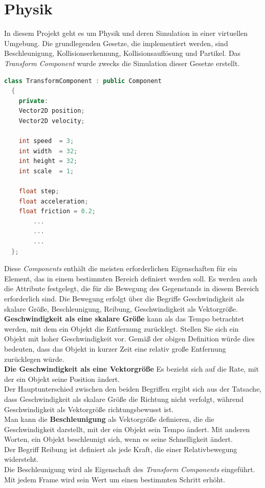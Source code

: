 \documentclass[
  10pt,
  a4paper,
  oneside,
  headers,
  headinclude,
  footinclude,
  BCOR5mm,
]{article}
\begin{document}
\section{Physik}
In diesem Projekt geht es um Physik und deren Simulation in einer virtuellen
Umgebung. Die grundlegenden Gesetze, die implementiert werden, sind
Beschleunigung, Kollisionserkennung, Kollisionsauflösung und Partikel. Das
\textit{Transform Component} wurde zwecks die Simulation dieser Gesetze erstellt.

\begin{lstlisting}[language=C++]
  class TransformComponent : public Component
  {
    private:
    Vector2D position;
    Vector2D velocity;

    int speed  = 3;
    int width  = 32;
    int height = 32;
    int scale  = 1;

    float step;
    float acceleration;
    float friction = 0.2;
        ...
        ...
        ...
  };
\end{lstlisting}

Diese \textit{Components} enthält die meisten erforderlichen Eigenschaften für
ein Element, das in einem bestimmten Bereich definiert werden soll. Es werden
auch die Attribute festgelegt, die für die Bewegung des Gegenstands in diesem
Bereich erforderlich sind.
Die Bewegung erfolgt über die Begriffe Geschwindigkeit als skalare Größe,
Beschleunigung, Reibung, Geschwindigkeit als Vektorgröße. \\
\textbf{Geschwindigkeit als eine skalare Größe} kann als das Tempo betrachtet
werden, mit dem ein Objekt die Entfernung zurücklegt. Stellen Sie sich ein
Objekt mit hoher Geschwindigkeit vor. Gemäß der obigen Definition würde dies
bedeuten, dass das Objekt in kurzer Zeit eine relativ große Entfernung
zurücklegen würde. \\
\textbf{Die Geschwindigkeit als eine Vektorgröße} Es bezieht sich auf die Rate,
mit der ein Objekt seine Position ändert.\\
Der Hauptunterschied zwischen den beiden Begriffen ergibt sich aus der Tatsache,
dass Geschwindigkeit als skalare Größe die Richtung nicht verfolgt, während
Geschwindigkeit als Vektorgröße richtungsbewusst ist. \\
Man kann die \textbf{Beschleunigung} als Vektorgröße definieren, die die
Geschwindigkeit darstellt, mit der ein Objekt sein Tempo ändert. Mit anderen
Worten, ein Objekt beschleunigt sich, wenn es seine Schnelligkeit ändert.\\
Der Begriff Reibung ist definiert als jede Kraft, die einer Relativbewegung
widersteht. \\
Die Beschleunigung wird als Eigenschaft des \textit{Transform Components}
eingeführt.
Mit jedem Frame wird sein Wert um einen bestimmten Schritt erhöht.
\end{document}
